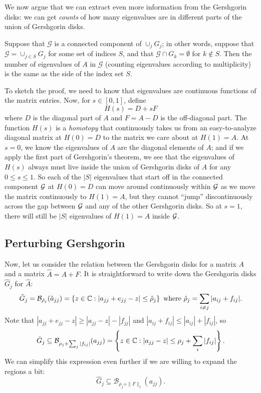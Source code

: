 \documentclass[12pt, leqno]{article} %
\newcommand{\calB}{\mathcal{B}}
\begin{document}
We now argue that we can extract even more information from the
Gershgorin disks: we can get {\em counts} of how many eigenvalues
are in different parts of the union of Gershgorin disks.

Suppose that $\mathcal{G}$ is a connected component of $\cup_j G_j$;
in other words, suppose that $\mathcal{G} = \cup_{j \in S} G_j$ for
some set of indices $S$, and that $\mathcal{G} \cap G_k = \emptyset$
for $k \not \in S$.  Then the number of eigenvalues of $A$ in
$\mathcal{G}$ (counting eigenvalues according to multiplicity) is the
same as the side of the index set $S$.

To sketch the proof, we need to know that eigenvalues are continuous
functions of the matrix entries.  Now, for $s \in [0,1]$, define
\[
  H(s) = D + sF
\]
where $D$ is the diagonal part of $A$ and $F = A-D$ is the off-diagonal
part.  The function $H(s)$ is a {\em homotopy} that continuously takes
us from an easy-to-analyze diagonal matrix at $H(0) = D$ to the matrix
we care about at $H(1) = A$.  At $s = 0$, we know the eigenvalues of $A$
are the diagonal elements of $A$; and if we apply the first part of Gershgorin's
theorem, we see that the eigenvalues of $H(s)$ always must live inside
the union of Gershgorin disks of $A$ for any $0 \leq s \leq 1$.
So each of the $|S|$ eigenvalues that start off in the connected component
$\mathcal{G}$ at $H(0) = D$ can move around continuously within $\mathcal{G}$
as we move the matrix continuously to $H(1) = A$, but they cannot ``jump''
discontinuously across the gap between $\mathcal{G}$ and any of the other Gershgorin
disks.  So at $s = 1$, there will still be $|S|$ eigenvalues of $H(1) = A$
inside $\mathcal{G}$.

\subsection{Perturbing Gershgorin}

Now, let us consider the relation between the Gershgorin disks for
a matrix $A$ and a matrix $\hat{A} = A+F$.  It is straightforward to write
down the Gershgorin disks $\hat{G}_j$ for $\hat{A}$:
\[
  \hat{G}_j = \calB_{\hat{\rho}_j}(\hat{a}_{jj}) =
  \left\{
    z \in \bbC : |a_{jj}+e_{jj}-z| \leq \hat{\rho}_j
  \right\}
    \mbox{ where }
    \hat{\rho}_j = \sum_{i \neq j} |a_{ij}+f_{ij}|.
\]
Note that $|a_{jj} + e_{jj} - z| \geq |a_{jj}-z|-|f_{jj}|$
and $|a_{ij}+f_{ij}| \leq |a_{ij}|+|f_{ij}|$, so
\begin{equation} \label{disk-bound-1}
  \hat{G}_j \subseteq \calB_{\rho_j + \sum_j |f_{ij}|}(a_{jj}) =
  \left\{
    z \in \bbC : |a_{jj}-z| \leq \rho_j + \sum_i |f_{ij}|
  \right\}.
\end{equation}
We can simplify this expression even further if we are willing
to expand the regions a bit:
\begin{equation} \label{disk-bound-2}
  \hat{G}_j \subseteq \calB_{\rho_j + \|F\|_{1}}(a_{jj}).
\end{equation}
\end{document}

